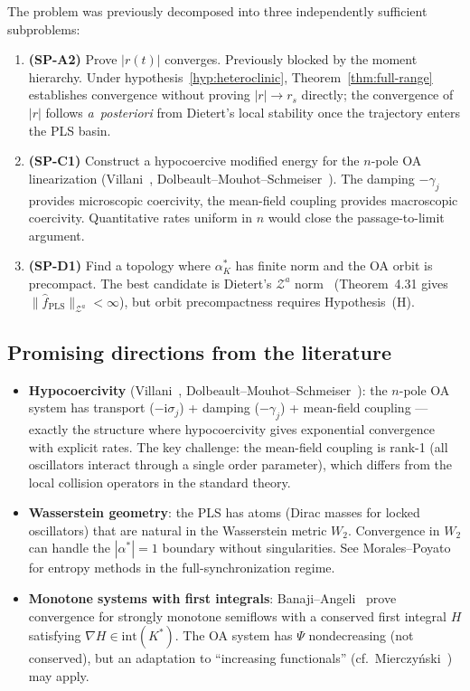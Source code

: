 \documentclass[11pt,a4paper]{article}
\theoremstyle{definition}
\begin{document}
The problem was previously decomposed into three independently sufficient subproblems:
\begin{enumerate}
\item \textbf{(SP-A2)} Prove $|r(t)|$ converges. Previously blocked by the moment hierarchy. Under hypothesis~\ref{hyp:heteroclinic}, Theorem~\ref{thm:full-range} establishes convergence without proving $|r| \to r_s$ directly; the convergence of $|r|$ follows \emph{a~posteriori} from Dietert's local stability once the trajectory enters the PLS basin.
\item \textbf{(SP-C1)} Construct a hypocoercive modified energy for the $n$-pole OA linearization (Villani~\cite{villani2009}, Dolbeault--Mouhot--Schmeiser~\cite{dms2015}). The damping $-\gamma_j$ provides microscopic coercivity, the mean-field coupling provides macroscopic coercivity. Quantitative rates uniform in $n$ would close the passage-to-limit argument.
\item \textbf{(SP-D1)} Find a topology where $\alpha^*_K$ has finite norm and the OA orbit is precompact. The best candidate is Dietert's $\mathcal{Z}^a$ norm~\cite{dietert-thesis} (Theorem~4.31 gives $\|\hat{f}_{\mathrm{PLS}}\|_{\mathcal{Z}^a} < \infty$), but orbit precompactness requires Hypothesis~(H).
\end{enumerate}

\subsection{Promising directions from the literature}

\begin{itemize}
\item \textbf{Hypocoercivity} (Villani~\cite{villani2009}, Dolbeault--Mouhot--Schmeiser~\cite{dms2015}): the $n$-pole OA system has transport ($-\mathrm{i}\sigma_j$) + damping ($-\gamma_j$) + mean-field coupling --- exactly the structure where hypocoercivity gives exponential convergence with explicit rates. The key challenge: the mean-field coupling is rank-1 (all oscillators interact through a single order parameter), which differs from the local collision operators in the standard theory.
\item \textbf{Wasserstein geometry}: the PLS has atoms (Dirac masses for locked oscillators) that are natural in the Wasserstein metric $W_2$. Convergence in $W_2$ can handle the $|\alpha^*| = 1$ boundary without singularities. See Morales--Poyato~\cite{morales-poyato2019} for entropy methods in the full-synchronization regime.
\item \textbf{Monotone systems with first integrals}: Banaji--Angeli~\cite{banaji-angeli2009} prove convergence for strongly monotone semiflows with a conserved first integral $H$ satisfying $\nabla H \in \mathrm{int}(K^*)$. The OA system has $\Psi$ nondecreasing (not conserved), but an adaptation to ``increasing functionals'' (cf.\ Mierczy\'nski~\cite{mierczynski1987}) may apply.
\end{itemize}
\end{document}
